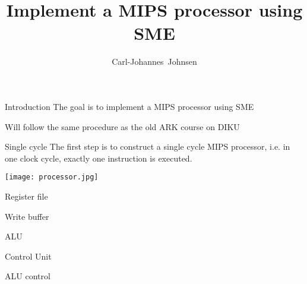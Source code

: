 \documentclass{beamer}
\title{Implement a MIPS processor using SME}
\author[Carl-Johannes Johnsen]{
  \mbox{Carl-Johannes Johnsen}}
\institute{Department of Computer Science\\
           University of Copenhagen}
\begin{document}
\frame{\titlepage}



\begin{frame}{Introduction}
    The goal is to implement a MIPS processor using SME

    Will follow the same procedure as the old ARK course on DIKU
\end{frame}

\begin{frame}{Single cycle}
    The first step is to construct a single cycle MIPS processor, i.e. in one
    clock cycle, exactly one instruction is executed.
    \begin{center}
        \texttt{[image: processor.jpg]}
    \end{center}
\end{frame}

\begin{frame}{Register file}
    
\end{frame}

\begin{frame}{Write buffer}
    
\end{frame}

\begin{frame}{ALU}
    
    
\end{frame}

\begin{frame}{Control Unit}
    
\end{frame}

\begin{frame}{ALU control}
    
\end{frame}
\end{document}
